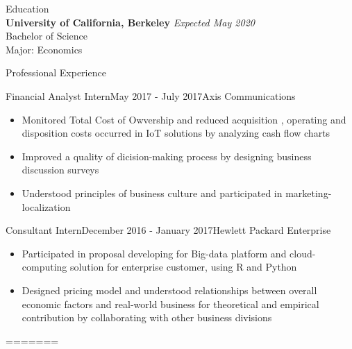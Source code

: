 \documentclass{resume}
\begin{document}
\begin{rSection}{Education}
\\{\bf University of California, Berkeley} \hfill {\em Expected May 2020} 
\\ Bachelor of Science 
\\ Major: Economics


\end{rSection}


\begin{rSection}{Professional Experience}

\begin{rSubsection}{Financial Analyst Intern}{May 2017 - July 2017}{Axis Communications}{}
\begin{itemize}
\item Monitored Total Cost of Owvership and reduced acquisition , operating and disposition costs occurred in IoT solutions by analyzing cash flow charts
\item Improved a quality of dicision-making process by designing business discussion surveys
\item Understood principles of business culture and participated in marketing-localization
\end{itemize}
\end{rSubsection}

\begin{rSubsection}{Consultant Intern}{December 2016 - January 2017}{Hewlett Packard Enterprise}{}
\begin{itemize}
\item Participated in proposal developing for Big-data platform and cloud-computing solution for enterprise customer, using R and Python
\item Designed pricing model and understood relationships between overall economic factors and real-world business for theoretical and empirical contribution by collaborating with other business divisions
\end{itemize}
\end{rSubsection}
=======
%
%
%
%


\end{rSection}
\end{document}
